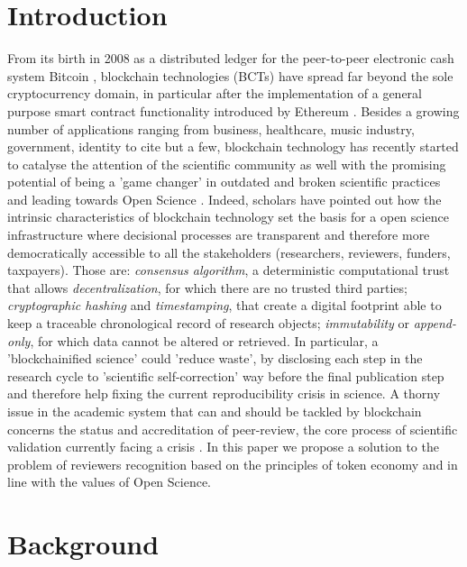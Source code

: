 \documentclass[runningheads]{llncs}
\begin{document}
\section{Introduction}
From its birth in 2008 as a distributed ledger for the peer-to-peer electronic cash system Bitcoin \cite{BitcoinSatoshi}, blockchain technologies (BCTs) have spread far beyond the sole cryptocurrency domain, in particular after the implementation of a general purpose smart contract functionality introduced by Ethereum \cite{Ethereum}.
Besides a growing number of applications ranging from business, healthcare, music industry, government, identity to cite but a few, blockchain technology has recently started to catalyse the attention of the scientific community as well \cite{Bitcoin-Nature-focus,vanRossum2017-DigSci} with the promising potential of being a 'game changer' in outdated and broken scientific practices and leading towards Open Science \cite{AES}. Indeed, scholars have pointed out how the intrinsic characteristics of blockchain technology set the basis for a open science infrastructure \cite{ReviewBlockchain2019} where decisional processes are transparent and therefore more democratically accessible to all the stakeholders (researchers, reviewers, funders, taxpayers). Those are: \emph{consensus algorithm}, a deterministic computational trust that allows \emph{decentralization}, for which there are no trusted third parties; \emph{cryptographic hashing} and \emph{timestamping}, that create a digital footprint able to keep a traceable chronological record of research objects; \emph{immutability} or \emph{append-only}, for which data cannot be altered or retrieved. In particular, a 'blockchainified science'\cite{BlockchainforScience} could 'reduce waste'\cite{ReducingWaste-Lancet}, by disclosing each step in the research cycle to 'scientific self-correction' way before the final publication step and therefore help fixing the current reproducibility crisis in science.
\newline A thorny issue in the academic system that can and should be tackled by blockchain concerns the status and accreditation of peer-review, the core process of scientific validation currently facing a crisis \cite{Gropp-PeerRevStress}.
In this paper we propose a solution to the problem of reviewers recognition based on the principles of token economy and in line with the values of Open Science.

\section{Background}
\end{document}
